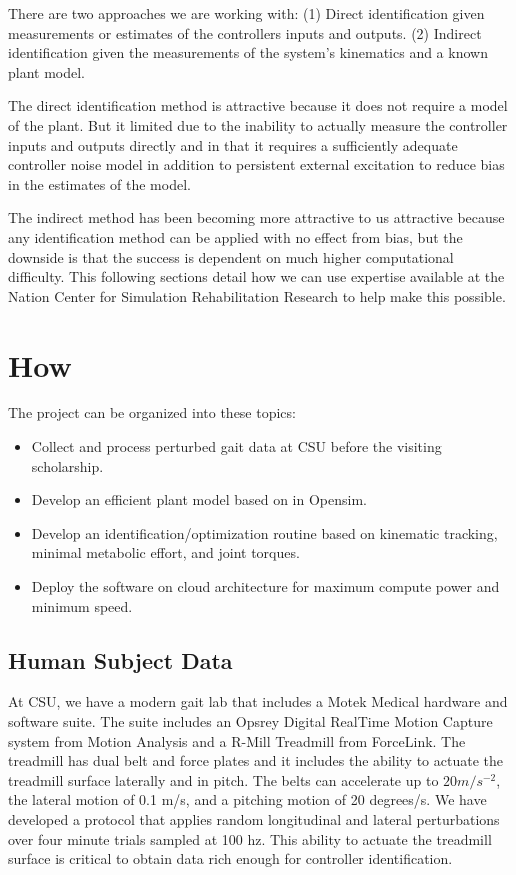 \documentclass[11pt]{article}
\begin{document}
There are two approaches we are working with: (1) Direct identification given
measurements or estimates of the controllers inputs and outputs. (2) Indirect
identification given the measurements of the system's kinematics and a known
plant model.

The direct identification method is attractive because it does not require a
model of the plant. But it limited due to the inability to actually measure the
controller inputs and outputs directly and in that it requires a sufficiently
adequate controller noise model in addition to persistent external excitation
to reduce bias in the estimates of the model.

The indirect method has been becoming more attractive to us attractive because
any identification method can be applied with no effect from bias, but the
downside is that the success is dependent on much higher computational
difficulty. This following sections detail how we can use expertise available
at the Nation Center for Simulation Rehabilitation Research to help make this
possible.

\section*{How}

The project can be organized into these topics:

\begin{itemize}
  \item Collect and process perturbed gait data at CSU before the visiting
    scholarship.
  \item Develop an efficient plant model based on \cite{Wang2012} in Opensim.
  \item Develop an identification/optimization routine based on kinematic
    tracking, minimal metabolic effort, and joint torques.
  \item Deploy the software on cloud architecture for maximum compute power and
    minimum speed.
\end{itemize}

\subsection*{Human Subject Data}

At CSU, we have a modern gait lab that includes a Motek Medical hardware and
software suite. The suite includes an Opsrey Digital RealTime Motion Capture
system from Motion Analysis and a R-Mill Treadmill from ForceLink. The
treadmill has dual belt and force plates and it includes the ability to actuate
the treadmill surface laterally and in pitch. The belts can accelerate up to
$20 m/s^{-2}$, the lateral motion of 0.1 m/s, and a pitching motion of 20
degrees/s. We have developed a protocol that applies random longitudinal and
lateral perturbations over four minute trials sampled at 100 hz. This ability
to actuate the treadmill surface is critical to obtain data rich enough for
controller identification.
\end{document}
